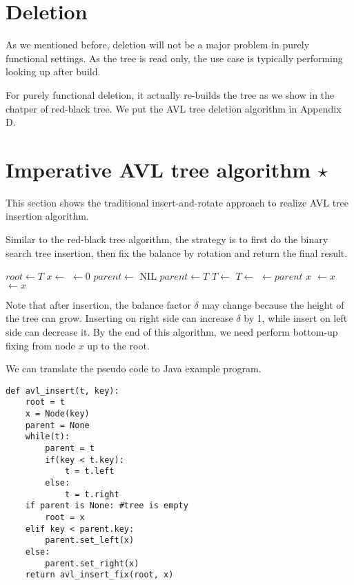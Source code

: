 \documentclass{article}
\begin{document}
\section{Deletion}

As we mentioned before, deletion will not be a major problem in
purely functional settings. As the tree is read only, the use case
is typically performing looking up after build.

For purely functional deletion, it actually re-builds the tree
as we show in the chatper of red-black tree. We put the AVL
tree deletion algorithm in Appendix D.

\section{Imperative AVL tree algorithm $\star$}

This section shows the traditional insert-and-rotate
approach to realize AVL tree insertion algorithm.

Similar to the red-black tree algorithm, the strategy
is to first do the binary search tree insertion,
then fix the balance by rotation and return the final result.

\begin{algorithmic}[1]
  \State $root \gets T$
  \State $x \gets$ 
  \State {} $\gets 0$
  \State $parent \gets$ NIL
    \State $parent \gets T$
      \State $T \gets $ 
    \Else
      \State $T \gets $ 
    \EndIf
  \EndWhile
  \State {} $\gets parent$
   
    \State \Return $x$
    \State {} $\gets x$
  \Else
    \State {} $\gets x$
  \EndIf
  \State \Return {}
\EndFunction
\end{algorithmic}

Note that after insertion, the balance factor $\delta$ may change because
the height of the tree can grow. Inserting on right side can
increase $\delta$ by 1, while insert on left side can decrease it. By
the end of this algorithm, we need perform bottom-up fixing from node $x$
up to the root.

We can translate the pseudo code to Java example program.

\lstset{language=Python}
\begin{lstlisting}
def avl_insert(t, key):
    root = t
    x = Node(key)
    parent = None
    while(t):
        parent = t
        if(key < t.key):
            t = t.left
        else:
            t = t.right
    if parent is None: #tree is empty
        root = x
    elif key < parent.key:
        parent.set_left(x)
    else:
        parent.set_right(x)
    return avl_insert_fix(root, x)
\end{lstlisting}
\end{document}

